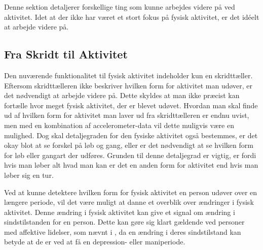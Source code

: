 Denne sektion detaljerer forskellige ting som kunne arbejdes videre på ved aktivitet.
Idet at der ikke har været et stort fokus på fysisk aktivitet, er det idéelt at arbejde videre på.

\subsection{Fra Skridt til Aktivitet}
Den nuværende funktionalitet til fysisk aktivitet indeholder kun en skridttæller.
Eftersom skridttælleren ikke beskriver hvilken form for aktivitet man udøver, er det nødvendigt at arbejde videre på.
Dette skyldes at man ikke præcist kan fortælle hvor meget fysisk aktivitet, der er blevet udøvet.
Hvordan man skal finde ud af hvilken form for aktivitet man laver ud fra skridttælleren er endnu uvist, men med en kombination af accelerometer-data vil dette muligvis være en mulighed.
Dog skal detaljegraden for den fysiske aktivitet også bestemmes, er det okay blot at se forskel på løb og gang, eller er det nødvendigt at se hvilken form for løb eller gangart der udføres.
Grunden til denne detaljegrad er vigtig, er fordi hvis man løber alt hvad man kan er det en anden form for aktivitet end hvis man løber sig en tur.

Ved at kunne detektere hvilken form for fysisk aktivitet en person udøver over en længere periode, vil det være muligt at danne et overblik over ændringer i fysisk aktivitet.
Denne ændring i fysisk aktivitet kan give et signal om ændring i sindstilstanden for en person.
Dette kan gøre sig klart gældende ved personer med affektive lidelser, som nævnt i \citet[Kapitel 1, Sektion 4]{misc:faellesrapp}, da en ændring i deres sindstilstand kan betyde at de er ved at få en depression- eller maniperiode.

\begin{comment}
Den nuværende funktionalitet til fysisk aktivitet er kun en skridttæller, fra denne vil det næste logiske skridt være at lave noget der kan give et overblik over hvor meget fysisk aktivitet der har været ud fra antallet af skridt.
Helt præcist hvordan dette skal gøres og vises er uvist, men der er en mulighed for at det skulle kombineres med accelerometer data til at afgøre om der er tale om løb, gang eller anden form for bevægelse.
De forskellige gang typer skal så også fortolkes som forskellige form for aktivitet. 
Det ville også være nødvendigt at beslutte hvad for en enhed fysisk aktivitet er i, er det i Joule forbrændt eller noget andet?

Udover at beslutte hvordan fysisk aktivitet skal bestemmes skal man også beslutte sig for hvad det skal bruges til.
I sammenhæng med det primære fokus vi har på affektive lidelser, vil et oplagt fokus være at se på ændringer i mængden af fysisk aktivitet, da det giver et signal om ændringer i sindstilstand for patienter med affektive lidelser, hvilket også blev nævnt i \citet[Kapitel 1, Sektion 4]{misc:faellesrapp}.
\end{comment}
